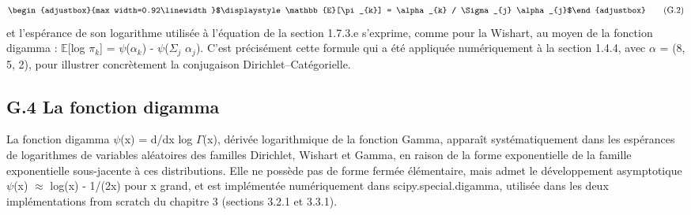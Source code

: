 \begin{equation}
\begin{adjustbox}{max width=0.92\linewidth}$\displaystyle \mathbb{E}[\pi _{k}] = \alpha _{k} / \Sigma _{j} \alpha _{j}$\end{adjustbox}
\tag{G.2}
\label{eq:G_2}
\end{equation}
et l'espérance de son logarithme  utilisée à l'équation de la section 1.7.3.e  s'exprime, comme pour la Wishart, au moyen de la fonction digamma : $\mathbb{E}$[log $\pi _{k}$] = $\psi $($\alpha _{k}$) - $\psi $($\Sigma _{j}$ $\alpha _{j}$). C'est précisément cette formule qui a été appliquée numériquement à la section 1.4.4, avec $\alpha $ = (8, 5, 2), pour illustrer concrètement la conjugaison Dirichlet--Catégorielle.

\subsection*{G.4 La fonction digamma}
La fonction digamma $\psi $(x) = d/dx log $\Gamma $(x), dérivée logarithmique de la fonction Gamma, apparaît systématiquement dans les espérances de logarithmes de variables aléatoires des familles Dirichlet, Wishart et Gamma, en raison de la forme exponentielle de la famille exponentielle sous-jacente à ces distributions. Elle ne possède pas de forme fermée élémentaire, mais admet le développement asymptotique $\psi $(x) $\approx $ log(x) - 1/(2x) pour x grand, et est implémentée numériquement dans scipy.special.digamma, utilisée dans les deux implémentations from scratch du chapitre 3 (sections 3.2.1 et 3.3.1).
